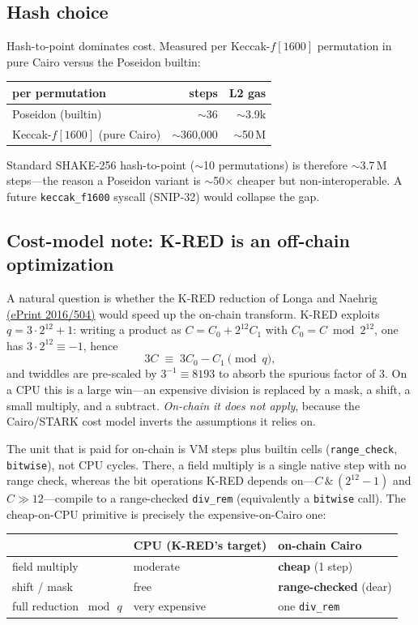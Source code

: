\documentclass[11pt]{article}
\begin{document}
\subsection{Hash choice}
Hash-to-point dominates cost. Measured per Keccak-$f[1600]$ permutation in pure Cairo versus
the Poseidon builtin:
\begin{center}
\begin{tabular}{lrr}
\toprule
per permutation & steps & L2 gas \\
\midrule
Poseidon (builtin) & $\sim$36 & $\sim$3.9k \\
Keccak-$f[1600]$ (pure Cairo) & $\sim$360{,}000 & $\sim$50\,M \\
\bottomrule
\end{tabular}
\end{center}
Standard SHAKE-256 hash-to-point ($\sim$10 permutations) is therefore $\sim$3.7\,M steps---the
reason a Poseidon variant is $\sim$50$\times$ cheaper but non-interoperable. A future
\texttt{keccak\_f1600} syscall (SNIP-32) would collapse the gap.

\subsection{Cost-model note: K-RED is an off-chain optimization}\label{sec:kred}
A natural question is whether the K-RED reduction of Longa and Naehrig
\href{https://eprint.iacr.org/2016/504}{(ePrint 2016/504)} would speed up the on-chain
transform. K-RED exploits $q=3\cdot 2^{12}+1$: writing a product as $C=C_0+2^{12}C_1$ with
$C_0=C\bmod 2^{12}$, one has $3\cdot 2^{12}\equiv-1$, hence
\begin{equation}
  3C \;\equiv\; 3C_0 - C_1 \pmod q,
\end{equation}
and twiddles are pre-scaled by $3^{-1}\equiv 8193$ to absorb the spurious factor of $3$. On a
CPU this is a large win---an expensive division is replaced by a mask, a shift, a small
multiply, and a subtract. \emph{On-chain it does not apply}, because the Cairo/STARK cost model
inverts the assumptions it relies on.

The unit that is paid for on-chain is VM steps plus builtin cells (\texttt{range\_check},
\texttt{bitwise}), not CPU cycles. There, a field multiply is a single native step with no
range check, whereas the bit operations K-RED depends on---$C\,\&\,(2^{12}{-}1)$ and
$C\gg 12$---compile to a range-checked \texttt{div\_rem} (equivalently a \texttt{bitwise}
call). The cheap-on-CPU primitive is precisely the expensive-on-Cairo one:
\begin{center}
\begin{tabular}{lll}
\toprule
 & CPU (K-RED's target) & on-chain Cairo \\
\midrule
field multiply & moderate & \textbf{cheap} (1 step) \\
shift / mask & free & \textbf{range-checked} (dear) \\
full reduction $\bmod\,q$ & very expensive & one \texttt{div\_rem} \\
\bottomrule
\end{tabular}
\end{center}
\end{document}
